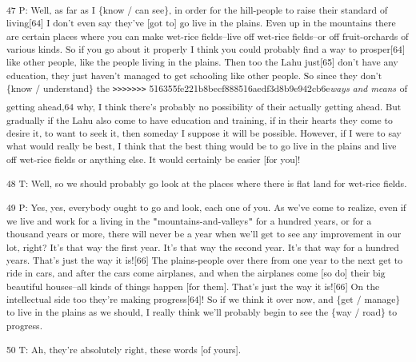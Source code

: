 \textsuperscript{47 P: Well, as far as I \{know / can see\}, in order for the hill-people
to raise their standard of living[64] I don't even say they've [got to] go live
in the plains. Even up in the mountains there are certain places where you can
make wet-rice fields--live off wet-rice fields--or off fruit-orchards of various
kinds. So if you go about it properly I think you could probably find a way to
prosper[64] like other people, like the people living in the plains. Then too the
Lahu just[65] don't have any education, they just haven't managed to get schooling
like other people. So since they don't \{know / understand\} the \texttt{>}\texttt{>}\texttt{>}\texttt{>}\texttt{>}\texttt{>}\texttt{>}
516355fe221b8becf888516aedf3d8b9e942cb6e}\textsuperscript{\textit{ways and means}}\textsuperscript{
of getting ahead,64 why, I think there's probably no possibility of their actually
getting ahead. But gradually if the Lahu also come to have education and training,
if in their hearts they come to desire it, to want to seek it, then someday I suppose
it will be possible. However, if I were to say what would really be best, I think
that the best thing would be to go live in the plains and live off wet-rice fields
or anything else. It would certainly be easier [for you]! }

\textsuperscript{48 T: Well, so we should probably go look at the places where
there is flat land for wet-rice fields. }

\textsuperscript{49 P: Yes, yes, everybody ought to go and look, each one of you.
As we've come to realize, even if we live and work for a living in the \texttt{"}mountains-and-valleys\texttt{"}
for a hundred years, or for a thousand years or more, there will never be a year
when we'll get to see any improvement in our lot, right? It's that way the first
year. It's that way the second year. It's that way for a hundred years. That's
just the way it is![66]  The plains-people over there from one year to the next
get to ride in cars, and after the cars come airplanes, and when the airplanes
come [so do] their big beautiful houses--all kinds of things happen [for them].
That's just the way it is![66] On the intellectual side too they're making progress[64]!
So if we think it over now, and \{get / manage\} to live in the plains as we should,
I really think we'll probably begin to see the \{way / road\} to progress. }

\textsuperscript{50 T: Ah, they're absolutely right, these words [of yours]. }


